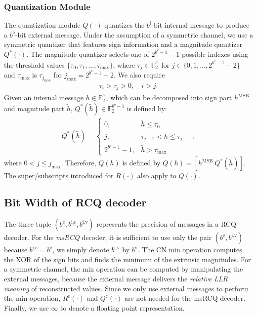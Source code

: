 \documentclass [PhD] {uclathes}
\begin{document}
\subsubsection{Quantization Module} The quantization module \texorpdfstring{$Q(\cdot)$}{Lg} quantizes the $b^{\text{i}}$-bit internal message to produce a $b^{\text{e}}$-bit external message.
Under the assumption of a symmetric channel, we use a symmetric quantizer that features sign information and a magnitude quantizer $Q^*(\cdot)$.
The magnitude quantizer selects one of $2^{b^\text{e}-1}-1$ possible indexes using the threshold values $\{\tau_0,\tau_1,...,\tau_{\text{max}}\}$, where  $\tau_j\in\mathbb{F}_2^{b^{\mathrm{i}}}$ for $j\in\{0,1,...,2^{b^\text{e}-1}-2\}$ and $\tau_{\text{max}}$ is $\tau_{j_{\text{max}}}$ for $j_{\text{max}} = 2^{b^\text{e}-1}-2$.  We also require
\begin{align}
    {\tau}_i>{\tau}_j>0,\quad i>j.
\end{align}
Given an internal message $h\in\mathbb{F}_2^{b^{\mathrm{i}}}$, which can be decomposed into sign part $h^{\text{MSB}}$ and magnitude part $\tilde{h}$, $Q^*(\tilde{h})\in \mathbb{F}_2^{b^{\mathrm{e}}-1}$ is defined by:
\begin{align}
   {{Q^*(\tilde{h})}}=\left\{\begin{matrix}
 0,& \tilde{{h}} \leq {\tau}_0 \\ 
 j, &  {\tau}_{j-1} <  \tilde{{h}} \leq {\tau}_{j} \\
 2^{b^{\text{e}}-1}-1, & \tilde{h} >  {\tau}_{\text{max}}
\end{matrix}\quad,\right.\label{equ: quantization_mag}
\end{align}
where $0<j\le j_{\text{max}}$. Therefore, $Q(h)$ is defined by
$Q(h)=[h^{\text{MSB}}\ Q^*(\tilde{h})]$.
The super/subscripts introduced for $R(\cdot)$ also apply to $Q(\cdot)$. 
\subsection{Bit Width of RCQ decoder}
 The three tuple $(b^\text{e},b^{\text{i,c}}, b^{\text{i,v}})$ represents the precision of messages in a RCQ decoder. 
For the \emph{msRCQ} decoder, it is sufficient to use only the pair $(b^\text{e},b^{\text{i,v}})$ because $b^{\text{i,c}}=b^\text{e}$, we simply denote $b^{\text{i,v}}$ by $b^{\text{v}}$.   The CN min operation computes the XOR of the sign bits and finds the minimum of the extrinsic magnitudes. For a symmetric channel, the min operation can be computed by manipulating the external messages, because the external message delivers the  \emph{relative LLR meaning}  of reconstructed values.  Since we only use external messages to perform the min operation, $R^\text{c}(\cdot)$ and $Q^\text{c}(\cdot)$ are not needed for the {msRCQ decoder}. Finally, we use $\infty$ to denote a floating point representation. 
\end{document}
